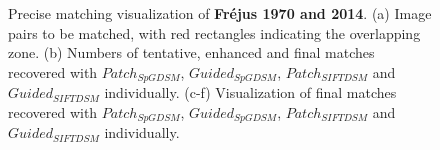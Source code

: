 \begin{figure}[htbp]
\begin{center}
{\begin{minipage}[t]{0.48\linewidth}
			\end{minipage}%
		}
		\caption{Precise matching visualization of \textbf{Fr{\'e}jus 1970 and 2014}. (a) Image pairs to be matched, with red rectangles indicating the overlapping zone. (b) Numbers of tentative, enhanced and final matches recovered with $Patch_{SpGDSM}$, $Guided_{SpGDSM}$, $Patch_{SIFTDSM}$ and $Guided_{SIFTDSM}$ individually. (c-f) Visualization of final matches recovered with $Patch_{SpGDSM}$, $Guided_{SpGDSM}$, $Patch_{SIFTDSM}$ and $Guided_{SIFTDSM}$ individually.}
		\label{MatchVizFrejus1970-2014}
	\end{center}
\end{figure} 



